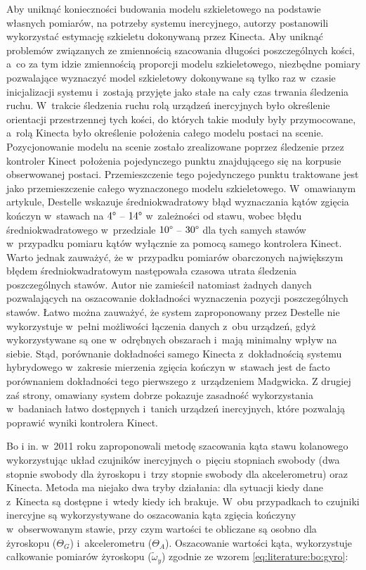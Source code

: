 Aby uniknąć konieczności budowania modelu szkieletowego na podstawie własnych pomiarów, na potrzeby systemu inercyjnego, autorzy postanowili wykorzystać estymację szkieletu dokonywaną przez Kinecta. Aby uniknąć problemów związanych ze zmiennością szacowania długości poszczególnych kości, a~co za tym idzie zmiennością proporcji modelu szkieletowego, niezbędne pomiary pozwalające wyznaczyć model szkieletowy dokonywane są tylko raz w~czasie inicjalizacji systemu i~zostają przyjęte jako stałe na cały czas trwania śledzenia ruchu. W~trakcie śledzenia ruchu rolą urządzeń inercyjnych było określenie orientacji przestrzennej tych kości, do których takie moduły były przymocowane, a~rolą Kinecta było określenie położenia całego modelu postaci na scenie. Pozycjonowanie modelu na scenie zostało zrealizowane poprzez śledzenie przez kontroler Kinect położenia pojedynczego punktu znajdującego się na korpusie obserwowanej postaci. Przemieszczenie tego pojedynczego punktu traktowane jest jako przemieszczenie całego wyznaczonego modelu szkieletowego. W~omawianym artykule, Destelle wskazuje średniokwadratowy błąd wyznaczania kątów zgięcia kończyn w~stawach na $4\degree$ -- $14\degree$ w~zależności od stawu, wobec błędu średniokwadratowego w~przedziale $10\degree$ -- $30\degree$ dla tych samych stawów w~przypadku pomiaru kątów wyłącznie za pomocą samego kontrolera Kinect. Warto jednak zauważyć, że w~przypadku pomiarów obarczonych największym błędem średniokwadratowym następowała czasowa utrata śledzenia poszczególnych stawów. Autor nie zamieścił natomiast żadnych danych pozwalających na oszacowanie dokładności wyznaczenia pozycji poszczególnych stawów. Łatwo można zauważyć, że system zaproponowany przez Destelle nie wykorzystuje w~pełni możliwości łączenia danych z~obu urządzeń, gdyż wykorzystywane są one w~odrębnych obszarach i~mają minimalny wpływ na siebie. Stąd, porównanie dokładności samego Kinecta z~dokładnością systemu hybrydowego w~zakresie mierzenia zgięcia kończyn w~stawach jest de facto porównaniem dokładności tego pierwszego z~urządzeniem Madgwicka. Z drugiej zaś strony, omawiany system dobrze pokazuje zasadność wykorzystania w~badaniach łatwo dostępnych i~tanich urządzeń inercyjnych, które pozwalają poprawić wyniki kontrolera Kinect.	
								
Bo i in. \cite{Bo2011a} w~2011 roku zaproponowali metodę szacowania kąta stawu kolanowego wykorzystując układ czujników inercyjnych o~pięciu stopniach swobody (dwa stopnie swobody dla żyroskopu i~trzy stopnie swobody dla akcelerometru) oraz Kinecta. Metoda ma niejako dwa tryby działania: dla sytuacji kiedy dane z~Kinecta są dostępne i~wtedy kiedy ich brakuje. W~obu przypadkach to czujniki inercyjne są wykorzystywane do oszacowania kąta zgięcia kończyny w~obserwowanym stawie, przy czym wartości te obliczane są osobno dla żyroskopu ($\Theta_G$) i~akcelerometru ($\Theta_A$). Oszacowanie wartości kąta, wykorzystuje całkowanie pomiarów żyroskopu ($\tilde{\omega}_y$) zgodnie ze wzorem \ref{eq:literature:bo:gyro}:

